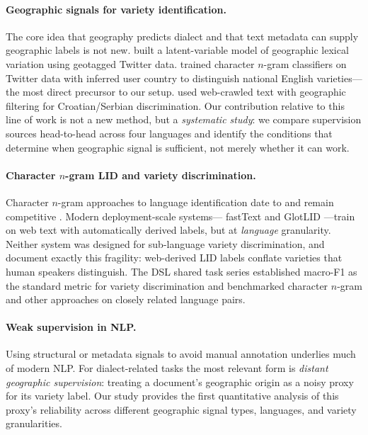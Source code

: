 \documentclass[11pt]{article}
\begin{document}
\paragraph{Geographic signals for variety identification.}
The core idea that geography predicts dialect and that text metadata can supply
geographic labels is not new.  \citet{eisenstein-etal-2010-latent} built a
latent-variable model of geographic lexical variation using geotagged Twitter
data.  \citet{lui-cook-2013-classifying} trained character $n$-gram classifiers
on Twitter data with inferred user country to distinguish national English
varieties---the most direct precursor to our setup.
\citet{tiedemann-ljubesic-2012-efficient} used web-crawled text with geographic
filtering for Croatian/Serbian discrimination.
Our contribution relative to this line of work is not a new method, but a
\emph{systematic study}: we compare supervision sources head-to-head across
four languages and identify the conditions that determine when geographic
signal is sufficient, not merely whether it can work.

\paragraph{Character $n$-gram LID and variety discrimination.}
Character $n$-gram approaches to language identification date to
\citet{cavnar-trenkle-1994-ngram} and remain competitive
\cite{jauhiainen-etal-2019-automatic}.  Modern deployment-scale systems---
fastText \cite{joulin-etal-2017-bag,grave-etal-2018-learning} and GlotLID
\cite{kargaran-etal-2023-glotlid}---train on web text with automatically
derived labels, but at \emph{language} granularity.  Neither system was
designed for sub-language variety discrimination, and
\citet{caswell-etal-2020-language} document exactly this fragility: web-derived
LID labels conflate varieties that human speakers distinguish.
The DSL shared task series \cite{zampieri-etal-2014-report} established
macro-F1 as the standard metric for variety discrimination and benchmarked
character $n$-gram and other approaches on closely related language pairs.

\paragraph{Weak supervision in NLP.}
Using structural or metadata signals to avoid manual annotation
\cite{mintz-etal-2009-distant} underlies much of modern NLP.
For dialect-related tasks the most relevant form is \emph{distant geographic
supervision}: treating a document's geographic origin as a noisy proxy for its
variety label.  Our study provides the first quantitative analysis of this
proxy's reliability across different geographic signal types, languages, and
variety granularities.
\end{document}
